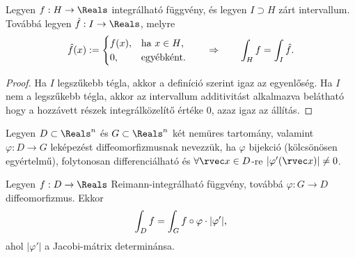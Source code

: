 \begin{statement}
  Legyen $f: H \to \Reals$ integrálható függvény, és legyen $I \supset H$ zárt
  intervallum. Továbbá legyen $\hat f: I \to \Reals$, melyre
  $$
    \hat f(x) :=
    \begin{cases}
      f(x), & \text{ha } x \in H \text{,} \\
      0,    & \text{egyébként.}
    \end{cases}
    \qquad \Rightarrow \qquad
    \int_H f = \int_I \hat f
    \text.
  $$

  \begin{proof}
    Ha $I$ legszűkebb tégla, akkor a definíció szerint igaz az egyenlőség. Ha
    $I$ nem a legszűkebb tégla, akkor az intervallum additivitást alkalmazva
    belátható hogy a hozzávett részek integrálközelítő értéke $0$, azaz igaz az
    állítás.
  \end{proof}
\end{statement}

\begin{definition}[Diffeomorfizmus]
  Legyen $D \subset \Reals^n$ és $G \subset \Reals^n$ két nemüres tartomány,
  valamint $\varphi: D \to G$ leképezést diffeomorfizmusnak nevezzük, ha
  $\varphi$ bijekció (kölcsönösen egyértelmű), folytonosan differenciálható és
  $\forall \rvec x \in D$-re $|\varphi'(\rvec x)| \neq 0$.
\end{definition}

\begin{statement}
  Legyen $f: D \to \Reals$ Reimann-integrálható függvény, továbbá
  $\varphi: G \to D$ diffeomorfizmus. Ekkor
  $$
    \int_D f = \int_G f \circ \varphi \cdot |\varphi'|
    \text,
  $$
  ahol $|\varphi'|$ a Jacobi-mátrix determinánsa.
\end{statement}